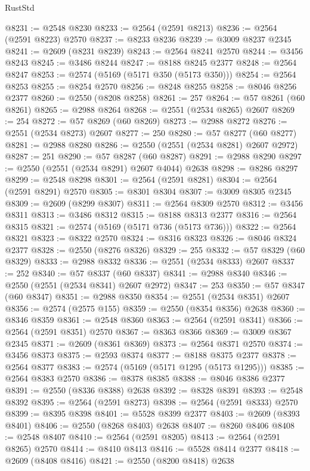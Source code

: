 \begin{lexlean}{RustStd}
\begin{coremodule}
@8231 := @2548 @8230
@8233 := @2564 (@2591 @8213)
@8236 := @2564 (@2591 @8223) @2570
@8237 := @8233 @8236
@8239 := @3009 @8237 @2345
@8241 := @2609 (@8231 @8239)
@8243 := @2564 @8241 @2570
@8244 := @3456 @8243
@8245 := @3486 @8244
@8247 := @8188 @8245 @2377
@8248 := @2564 @8247
@8253 := @2574 (@5169 (@5171 @350 (@5173 @350)))
@8254 := @2564 @8253
@8255 := @8254 @2570
@8256 := @8248 @8255
@8258 := @8046 @8256 @2377
@8260 := @2550 (@8208 @8258)
@8261 := 257
@8264 := @57 @8261 (@60 @8261)
@8265 := @2988 @8264
@8268 := @2551 (@2534 @8265) @2607
@8269 := 254
@8272 := @57 @8269 (@60 @8269)
@8273 := @2988 @8272
@8276 := @2551 (@2534 @8273) @2607
@8277 := 250
@8280 := @57 @8277 (@60 @8277)
@8281 := @2988 @8280
@8286 := @2550 (@2551 (@2534 @8281) @2607 @2972)
@8287 := 251
@8290 := @57 @8287 (@60 @8287)
@8291 := @2988 @8290
@8297 := @2550 (@2551 (@2534 @8291) @2607 @4044) @2638
@8298 := @8286 @8297
@8299 := @2548 @8298
@8301 := @2564 (@2591 @8281)
@8304 := @2564 (@2591 @8291) @2570
@8305 := @8301 @8304
@8307 := @3009 @8305 @2345
@8309 := @2609 (@8299 @8307)
@8311 := @2564 @8309 @2570
@8312 := @3456 @8311
@8313 := @3486 @8312
@8315 := @8188 @8313 @2377
@8316 := @2564 @8315
@8321 := @2574 (@5169 (@5171 @736 (@5173 @736)))
@8322 := @2564 @8321
@8323 := @8322 @2570
@8324 := @8316 @8323
@8326 := @8046 @8324 @2377
@8328 := @2550 (@8276 @8326)
@8329 := 255
@8332 := @57 @8329 (@60 @8329)
@8333 := @2988 @8332
@8336 := @2551 (@2534 @8333) @2607
@8337 := 252
@8340 := @57 @8337 (@60 @8337)
@8341 := @2988 @8340
@8346 := @2550 (@2551 (@2534 @8341) @2607 @2972)
@8347 := 253
@8350 := @57 @8347 (@60 @8347)
@8351 := @2988 @8350
@8354 := @2551 (@2534 @8351) @2607
@8356 := @2574 (@2575 @155)
@8359 := @2550 (@8354 @8356) @2638
@8360 := @8346 @8359
@8361 := @2548 @8360
@8363 := @2564 (@2591 @8341)
@8366 := @2564 (@2591 @8351) @2570
@8367 := @8363 @8366
@8369 := @3009 @8367 @2345
@8371 := @2609 (@8361 @8369)
@8373 := @2564 @8371 @2570
@8374 := @3456 @8373
@8375 := @2593 @8374
@8377 := @8188 @8375 @2377
@8378 := @2564 @8377
@8383 := @2574 (@5169 (@5171 @1295 (@5173 @1295)))
@8385 := @2564 @8383 @2570
@8386 := @8378 @8385
@8388 := @8046 @8386 @2377
@8391 := @2550 (@8336 @8388) @2638
@8392 := @8328 @8391
@8393 := @2548 @8392
@8395 := @2564 (@2591 @8273)
@8398 := @2564 (@2591 @8333) @2570
@8399 := @8395 @8398
@8401 := @5528 @8399 @2377
@8403 := @2609 (@8393 @8401)
@8406 := @2550 (@8268 @8403) @2638
@8407 := @8260 @8406
@8408 := @2548 @8407
@8410 := @2564 (@2591 @8205)
@8413 := @2564 (@2591 @8265) @2570
@8414 := @8410 @8413
@8416 := @5528 @8414 @2377
@8418 := @2609 (@8408 @8416)
@8421 := @2550 (@8200 @8418) @2638

\end{coremodule}
\end{lexlean}
